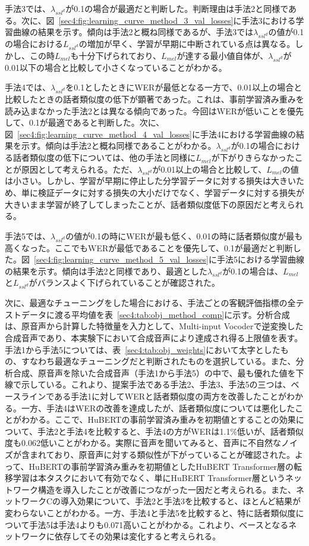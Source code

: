 \documentclass[12pt]{jarticle}
\numberwithin{equation}{section}    %
\numberwithin{figure}{section}      %
\numberwithin{table}{section}      %
\begin{document}
手法3では、$\lambda_{ssl^{d}}$が0.1の場合が最適だと判断した。判断理由は手法2と同様である。次に、図~\ref{sec4:fig:learning_curve_method_3_val_losses}に手法3における学習曲線の結果を示す。傾向は手法2と概ね同様であるが、手法3では$\lambda_{ssl^{d}}$の値が0.1の場合における$L_{ssl^{d}}$の増加が早く、学習が早期に中断されている点は異なる。しかし、この時$L_{mel}$も十分下げられており、$L_{mel}$が達する最小値自体が、$\lambda_{ssl^{d}}$が0.01以下の場合と比較して小さくなっていることがわかる。

手法4では、$\lambda_{ssl^{d}}$を0.1としたときにWERが最低となる一方で、0.01以上の場合と比較したときの話者類似度の低下が顕著であった。これは、事前学習済み重みを読み込まなかった手法2とは異なる傾向であった。今回はWERが低いことを優先して、0.1が最適であると判断した。次に、図~\ref{sec4:fig:learning_curve_method_4_val_losses}に手法4における学習曲線の結果を示す。傾向は手法2と概ね同様であることがわかる。$\lambda_{ssl^{d}}$が0.1の場合における話者類似度の低下については、他の手法と同様に$L_{mel}$が下がりきらなかったことが原因として考えられる。ただ、$\lambda_{ssl^{d}}$が0.01以上の場合と比較して、$L_{mel}$の値は小さい。しかし、学習が早期に停止した分学習データに対する損失は大きいため、単に検証データに対する損失の大小だけでなく、学習データに対する損失が大きいまま学習が終了してしまったことが、話者類似度低下の原因だと考えられる。

手法5では、$\lambda_{ssl^{d}}$の値が0.1の時にWERが最も低く、0.01の時に話者類似度が最も高くなった。ここでもWERが最低であることを優先して、0.1が最適だと判断した。図~\ref{sec4:fig:learning_curve_method_5_val_losses}に手法5における学習曲線の結果を示す。傾向は手法2と同様であり、最適とした$\lambda_{ssl^{d}}$が0.1の場合は、$L_{mel}$と$L_{ssl^{d}}$がバランスよく下げられていることが確認された。

次に、最適なチューニングをした場合における、手法ごとの客観評価指標の全テストデータに渡る平均値を表~\ref{sec4:tab:obj_method_comp}に示す。分析合成は、原音声から計算した特徴量を入力として、Multi-input Vocoderで逆変換した合成音声であり、本実験下において合成音声により達成され得る上限値を表す。手法1から手法5については、表~\ref{sec4:tab:obj_weights}において太字としたもの、すなわち最適なチューニングだと判断されたものを選択している。また、分析合成、原音声を除いた合成音声（手法1から手法5）の中で、最も優れた値を下線で示している。これより、提案手法である手法2、手法3、手法5の三つは、ベースラインである手法1に対してWERと話者類似度の両方を改善したことがわかる。一方、手法4はWERの改善を達成したが、話者類似度については悪化したことがわかる。ここで、HuBERTの事前学習済み重みを初期値とすることの効果について、手法2と手法4を比較すると、手法4の方がWERは1.1\%低いが、話者類似度も0.062低いことがわかる。実際に音声を聞いてみると、音声に不自然なノイズが含まれており、原音声に対する類似性が下がっていることが確認された。よって、HuBERTの事前学習済み重みを初期値としたHuBERT Transformer層の転移学習は本タスクにおいて有効でなく、単にHuBERT Transformer層というネットワーク構造を導入したことが改善につながった一因だと考えられる。また、ネットワークCの導入効果について、手法2と手法3を比較すると、ほとんど結果が変わらないことがわかる。一方、手法4と手法5を比較すると、特に話者類似度について手法5は手法4よりも0.071高いことがわかる。これより、ベースとなるネットワークに依存してその効果は変化すると考えられる。
\end{document}
